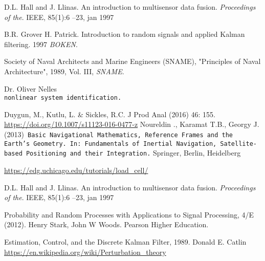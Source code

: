 \begin{thebibliography}{9}
D.L. Hall and J. Llinas. An introduction to multisensor data fusion. 
\textit{Proceedings of the}. IEEE, 85(1):6 –23, jan 1997

B.R. Grover H. Patrick. Introduction to random signals and applied Kalman filtering. 1997
\textit{BOKEN}. 

Society of Naval Architects and Marine Engineers (SNAME), "Principles of Naval Architecture", 1989, Vol. III,
\textit{SNAME}. 

 
Dr. Oliver Nelles
\\\texttt{nonlinear system identification.}

Duygun, M., Kutlu, L. \& Sickles, R.C. J Prod Anal (2016) 46: 155. \url{https://doi.org/10.1007/s11123-016-0477-z}
Noureldin ., Karamat T.B., Georgy J. (2013)\texttt{ Basic Navigational Mathematics, Reference Frames and the Earth’s Geometry. In: Fundamentals of Inertial Navigation, Satellite-based Positioning and their Integration.} Springer, Berlin, Heidelberg

  \url{https://edg.uchicago.edu/tutorials/load_cell/}

D.L. Hall and J. Llinas. An introduction to multisensor data fusion. 
\textit{Proceedings of
the}. IEEE, 85(1):6 –23, jan 1997

Probability and Random Processes with Applications to Signal Processing, 4/E (2012). 
Henry Stark, John W Woods. Pearson Higher Education. 

Estimation, Control, and the Discrete Kalman Filter, 1989. Donald E. Catlin
  \url{https://en.wikipedia.org/wiki/Perturbation_theory}

\end{thebibliography}
